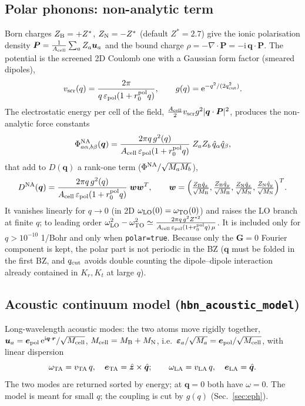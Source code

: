 \documentclass[11pt,a4paper]{article}
\newcommand{\ii}{\mathrm{i}}
\newcommand{\ee}{\mathrm{e}}
\newcommand{\qq}{\bm{q}}
\newcommand{\GG}{\bm{G}}
\newcommand{\hatq}{\hat{\bm{q}}}
\newcommand{\code}[1]{\texttt{#1}}
\newcommand{\Acell}{A_{\rm cell}}
\begin{document}
\subsection{Polar phonons: non-analytic term}
Born charges $Z_{\rm B}=+Z^*$, $Z_{\rm N}=-Z^*$ (default $Z^*=2.7$) give the ionic polarisation density
$\bm P=\frac{1}{\Acell}\sum_aZ_a\bm u_a$ and the bound charge $\rho=-\nabla\!\cdot\!\bm P=-\ii\,\qq\cdot\bm P$. The potential is the screened 2D Coulomb one with a Gaussian form factor (smeared dipoles),
\begin{equation}
v_{\rm scr}(q)=\frac{2\pi}{q\,\varepsilon_{\rm pol}(1+r_0^{\rm pol}q)},\qquad g(q)=\ee^{-q^2/(2q_{\rm cut}^2)}.
\end{equation}
The electrostatic energy per cell of the field, $\frac{\Acell}{2}v_{\rm scr}g^2|\qq\cdot\bm P|^2$, produces the non-analytic force constants
\begin{equation}
\Phi^{\rm NA}_{a\alpha,b\beta}(\qq)=\frac{2\pi q\,g^2(q)}{\Acell\,\varepsilon_{\rm pol}(1+r_0^{\rm pol}q)}\;Z_aZ_b\,\hat q_\alpha\hat q_\beta ,
\end{equation}
that add to $D(\qq)$ a rank-one term ($\Phi^{\rm NA}/\sqrt{M_aM_b}$),
\begin{equation}
D^{\rm NA}(\qq)=\frac{2\pi q\,g^2(q)}{\Acell\,\varepsilon_{\rm pol}(1+r_0^{\rm pol}q)}\;\bm w\bm w^{T},\qquad
\bm w=\Big(\tfrac{Z_{\rm B}\hat q_x}{\sqrt{M_{\rm B}}},\tfrac{Z_{\rm B}\hat q_y}{\sqrt{M_{\rm B}}},\tfrac{Z_{\rm N}\hat q_x}{\sqrt{M_{\rm N}}},\tfrac{Z_{\rm N}\hat q_y}{\sqrt{M_{\rm N}}}\Big)^{T}.
\label{eq:DNA}
\end{equation}
It vanishes linearly for $q\to0$ (in 2D $\omega_{\rm LO}(0)=\omega_{\rm TO}(0)$) and raises the LO branch at finite $q$; to leading order $\omega^2_{\rm LO}-\omega^2_{\rm TO}\simeq\frac{2\pi q\,g^2Z^{*2}}{\Acell\,\varepsilon_{\rm pol}(1+r_0^{\rm pol}q)\,\mu}$. It is included only for $q>10^{-10}$ 1/Bohr and only when \code{polar=true}. Because only the $\GG=0$ Fourier component is kept, the polar part is not periodic in the BZ ($\qq$ must be folded in the first BZ, and $q_{\rm cut}$ avoids double counting the dipole--dipole interaction already contained in $K_r,K_t$ at large $q$).

\subsection{Acoustic continuum model (\code{hbn\_acoustic\_model})}
Long-wavelength acoustic modes: the two atoms move rigidly together, $\bm u_a=\bm e_{\rm pol}\,\ee^{\ii\qq\cdot\bm r}/\sqrt{M_{\rm cell}}$, $M_{\rm cell}=M_{\rm B}+M_{\rm N}$, i.e.\ $\bm\varepsilon_a/\sqrt{M_a}=\bm e_{\rm pol}/\sqrt{M_{\rm cell}}$, with linear dispersion
\begin{equation}
\omega_{\rm TA}=v_{\rm TA}\,q,\quad \bm e_{\rm TA}=\hat{\bm z}\times\hatq;\qquad
\omega_{\rm LA}=v_{\rm LA}\,q,\quad \bm e_{\rm LA}=\hatq.
\end{equation}
The two modes are returned sorted by energy; at $\qq=0$ both have $\omega=0$. The model is meant for small $q$; the coupling is cut by $g(q)$ (Sec.~\ref{sec:eph}).
\end{document}

